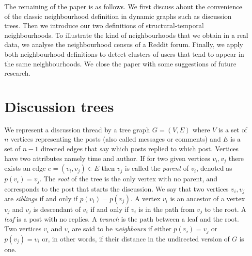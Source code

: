 \documentclass[conference]{IEEEtran}
\begin{document}
The remaining of the paper is as follows. We first discuss about the convenience of the classic neighbourhood definition in dynamic graphs such as discussion trees. Then we introduce our two definitions of structural-temporal neighbourhoods. To illustrate the kind of neighbourhoods that we obtain in a real data, we analyse the neighbourhood census of a Reddit forum. Finally, we apply both neighbourhood definitions to detect clusters of users that tend to appear in the same neighbourhoods. We close the paper with some suggestions of future research.

\section{Discussion trees}
We represent a discussion thread by a tree graph $G=(V,E)$ where $V$ is a set of $n$ vertices representing the posts (also called messages or comments) and $E$ is a set of $n-1$ directed edges that say which posts replied to which post. Vertices have two attributes namely time and author. If for two given vertices $v_i,v_j$ there exists an edge  $e=(v_i, v_j) \in E$ then $v_j$ is called the \textit{parent} of $v_i$, denoted as $p(v_i)=v_j$. The \textit{root} of the tree is the only vertex with no parent, and corresponds to the post that starts the discussion. We say that two vertices $v_i,v_j$ are \textit{siblings} if and only if $p(v_i)=p(v_j)$. A vertex $v_i$ is an ancestor of a vertex $v_j$ and $v_j$ is descendant of $v_i$ if and only if $v_i$ is in the path from $v_j$ to the root. A \textit{leaf} is a post with no replies. A \textit{branch} is the path between a leaf and the root. Two vertices $v_i$ and $v_i$ are said to be \textit{neighbours} if either $p(v_i)=v_j$ or $p(v_j)=v_i$ or, in other words, if their distance in the undirected version of $G$ is one.

\end{document}

